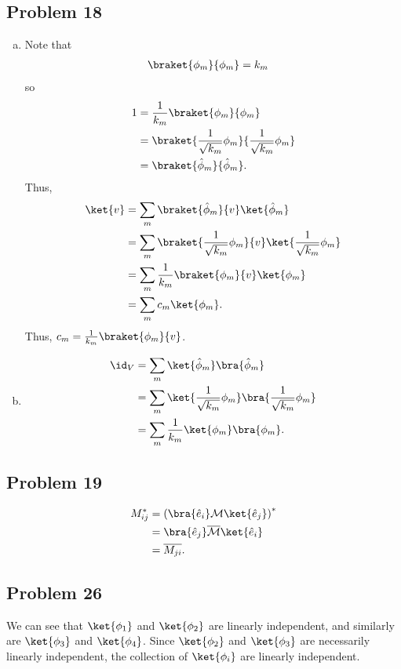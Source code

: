 \documentclass[10pt]{mypackage}
\begin{document}
\subsection{Problem 18}%
\begin{enumerate}[(a)]
  \item Note that
    \begin{align*}
      \braket{\phi_m}{\phi_m} &= k_m
    \end{align*}
    so
    \begin{align*}
      1 &= \frac{1}{k_m}\braket{\phi_m}{\phi_m}\\
          &= \braket{\frac{1}{\sqrt{k_m}}\phi_m}{\frac{1}{\sqrt{k_m}}\phi_m}\\
                  &= \braket{\hat{\phi}_m}{\hat{\phi}_{m}}.
    \end{align*}
    Thus,
    \begin{align*}
      \ket{v} &= \sum_{m}\braket{\hat{\phi}_m}{v}\ket{\hat{\phi}_m}\\
              &= \sum_{m}\braket{\frac{1}{\sqrt{k_m}}\phi_m}{v}\ket{\frac{1}{\sqrt{k_m}}\phi_m}\\
              &= \sum_{m}\frac{1}{k_m}\braket{\phi_m}{v}\ket{\phi_m}\\
              &= \sum_{m}c_m\ket{\phi_m}.
    \end{align*}
    Thus, $c_m = \frac{1}{k_m}\braket{\phi_m}{v}$.
  \item 
    \begin{align*}
      \id_{V} &= \sum_{m}\ket{\hat{\phi}_m}\bra{\hat{\phi}_m}\\
              &= \sum_{m}\ket{\frac{1}{\sqrt{k_m}}\phi_m}\bra{\frac{1}{\sqrt{k_m}}\phi_m}\\
              &= \sum_{m}\frac{1}{k_m}\ket{\phi_m}\bra{\phi_m}.
    \end{align*}
\end{enumerate}
\subsection{Problem 19}%
\begin{align*}
  M_{ij}^{\ast} &= \left(\bra{\hat{e}_i}\mathcal{M}\ket{\hat{e}_j}\right)^{\ast}\\
                &= \bra{\hat{e}_j}\overline{\mathcal{M}}\ket{\hat{e}_i}\\
                &= \overline{M_{ji}}.
\end{align*}
\subsection{Problem 26}%
We can see that $\ket{\phi_1}$ and $\ket{\phi_2}$ are linearly independent, and similarly are $\ket{\phi_3}$ and $\ket{\phi_4}$.  Since $\ket{\phi_2}$ and $\ket{\phi_3}$ are necessarily linearly independent, the collection of $\ket{\phi_i}$ are linearly independent.\newline
\end{document}
